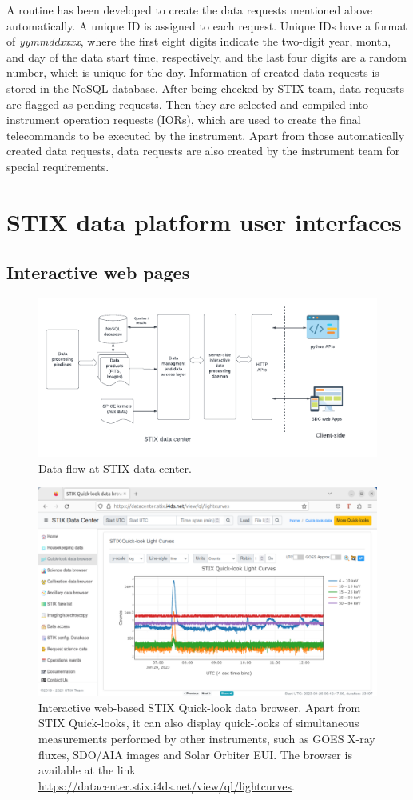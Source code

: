 \documentclass[referee]{aa} %
\begin{document}
A routine has been developed to create the data requests mentioned above automatically. 
A unique ID is assigned to each request.
Unique IDs have a format of {\em yymmddxxxx}, where 
the first eight digits indicate the two-digit year,  month, and day of the data start time, respectively, 
and the last four digits are a random number, which is unique for the day.  
Information of created data requests is stored in the NoSQL database. 
After being checked by STIX team, data requests are flagged as pending requests.
Then they are selected and compiled into instrument operation requests (IORs), which are used to create the final telecommands
to be executed by the instrument.
Apart from those automatically created data requests, 
data requests are also created by the instrument team for special requirements.
\section{STIX data platform user interfaces}


\subsection{Interactive web pages}
\begin{figure}[h]
  \centering
  \includegraphics[width=0.9\linewidth]{figures/interfaces.pdf}
  \caption{ 
    Data flow at STIX data center.
  }
  \label{fig:interfaces}
\end{figure}

\begin{figure}[h]
  \centering
  \includegraphics[width=0.7\linewidth]{figures/data-browser.pdf}
  \caption{ 
    Interactive web-based STIX Quick-look data browser. 
    Apart from STIX Quick-looks, it can also display quick-looks of simultaneous measurements 
    performed by other instruments, such as GOES X-ray fluxes, SDO/AIA images and Solar Orbiter EUI. 
    The browser is available at the link \url{https://datacenter.stix.i4ds.net/view/ql/lightcurves}.}
  \label{fig:qlbrowser}
\end{figure}
\end{document}
